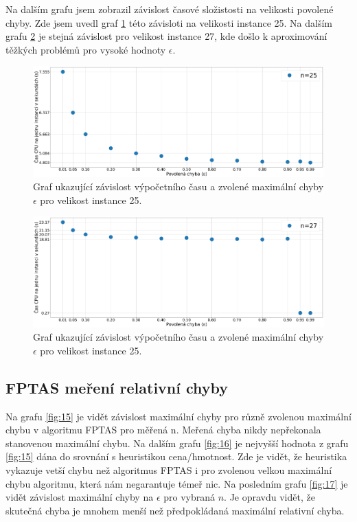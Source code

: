 \documentclass[11pt]{article}
\begin{document}
Na dalším grafu jsem zobrazil závislost časové složistosti na velikosti povolené chyby. Zde jsem uvedl graf \ref{fig:13} této závisloti na velikosti instance 25. Na dalším grafu \ref{fig:14} je stejná závislost pro velikost instance 27, kde došlo k aproximování těžkých problémů pro vysoké hodnoty $\epsilon$.
 
\begin{figure}[h]\centering
	\includegraphics[scale=0.2]{img/FPTASTimeEPS25}
 	\caption[2]{Graf ukazující závislost výpočetního času a zvolené maximální chyby $\epsilon$ pro velikost instance 25.}\label{fig:13}
 \end{figure} 	
 \begin{figure}[h]\centering
	\includegraphics[scale=0.2]{img/FPTASTimeEPS27}
 	\caption[2]{Graf ukazující závislost výpočetního času a zvolené maximální chyby $\epsilon$ pro velikost instance 25.}\label{fig:14}
 \end{figure} 	 
 
\subsection{FPTAS meření relativní chyby} 
 Na grafu \ref{fig:15} je vidět závislost maximální chyby pro různě zvolenou maximální chybu v algoritmu FPTAS pro měřená n. Meřená chyba nikdy nepřekonala stanovenou maximální chybu. Na dalším grafu \ref{fig:16} je nejvyšší hodnota z grafu \ref{fig:15} dána do srovnání s heuristikou cena/hmotnost. Zde je vidět, že heuristika vykazuje vetší chybu než algoritmus FPTAS i pro zvolenou velkou maximální chybu algoritmu, která nám negarantuje témeř nic. Na posledním grafu \ref{fig:17} je vidět závislost maximální chyby na $\epsilon$ pro vybraná $n$. Je opravdu vidět, že skutečná chyba je mnohem menší než předpokládaná maximální relativní chyba.
 
\end{document}
